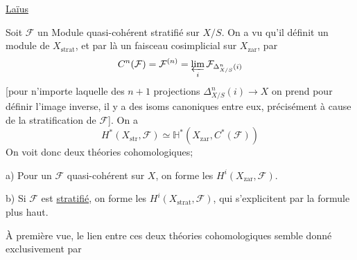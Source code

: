 \uline{Laïus}

Soit $\mathcal{F}$ un Module quasi-cohérent stratifié sur $X/S$.
On a vu qu'il définit un module de $X_{\mathrm{strat}}$, et par là un faisceau cosimplicial
sur $X_{\mathrm{zar}}$, par
\[
C^n(\mathcal{F})=\mathcal{F}^{(n)}
=\varprojlim_i\mathcal{F}_{\Delta^n_{X/S}(i)}
\]
[pour n'importe laquelle des $n+1$ projections $\Delta^n_{X/S}(i)\to X$ on prend pour définir l'image inverse, il y a des isoms canoniques entre eux, précisément à cause de la stratification de $\mathcal{F}$].
On a
\[
\boxed{H^*(X_{\mathrm{str}},\mathcal{F})
\simeq\mathbb{H}^*(X_{\mathrm{zar}},C^*(\mathcal{F}))}
\]
On voit donc deux théories cohomologiques;

a) Pour un $\mathcal{F}$ quasi-cohérent sur $X$, on forme les $H^i(X_{\mathrm{zar}},\mathcal{F})$.

b) Si $\mathcal{F}$ est \uline{stratifié}, on forme les $H^i(X_{\mathrm{strat}},\mathcal{F})$, qui s'explicitent par la formule plus haut.

À première vue, le lien entre ces deux théories cohomologiques semble donné exclusivement par


